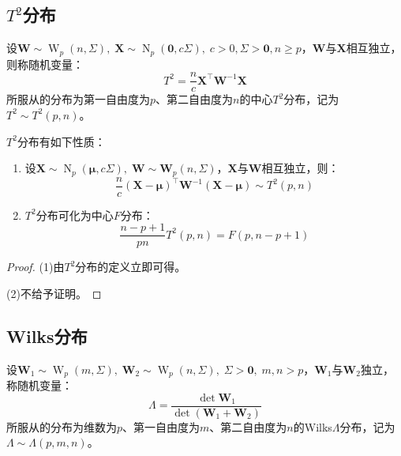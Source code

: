 \subsection{$T^2$分布}
\begin{definition}
	设$\mathbf{W}\sim\operatorname{W}_p(n,\Sigma),\;\mathbf{X}\sim\operatorname{N}_p(\mathbf{0},c\Sigma),\;c>0,\Sigma>\mathbf{0},n\geqslant p$，$\mathbf{W}$与$\mathbf{X}$相互独立，则称随机变量：
	\begin{equation*}
		T^2=\frac{n}{c}\mathbf{X}^{\top}\mathbf{W}^{-1}\mathbf{X}
	\end{equation*}
	所服从的分布为第一自由度为$p$、第二自由度为$n$的中心$T^2$分布，记为$T^2\sim T^2(p,n)$。
\end{definition}
\begin{property}\label{prop:T^2}
	$T^2$分布有如下性质：
	\begin{enumerate}
		\item 设$\mathbf{X}\sim\operatorname{N}_p(\boldsymbol{\mu},c\Sigma),\;\mathbf{W}\sim\mathbf{W}_p(n,\Sigma)$，$\mathbf{X}$与$\mathbf{W}$相互独立，则：
		\begin{equation*}
			\frac{n}{c}(\mathbf{X}-\boldsymbol{\mu})^{\top}\mathbf{W}^{-1}(\mathbf{X}-\boldsymbol{\mu})\sim T^2(p,n)
		\end{equation*}
		\item $T^2$分布可化为中心$F$分布：
		\begin{equation*}
			\frac{n-p+1}{pn}T^2(p,n)=F(p,n-p+1)
		\end{equation*}
	\end{enumerate}
\end{property}
\begin{proof}
	(1)由$T^2$分布的定义立即可得。\par
	(2)不给予证明。
\end{proof}

\subsection{Wilks分布}
\begin{definition}
	设$\mathbf{W}_1\sim\operatorname{W}_p(m,\Sigma),\;\mathbf{W}_2\sim\operatorname{W}_p(n,\Sigma),\;\Sigma>\mathbf{0},\;m,n>p$，$\mathbf{W}_1$与$\mathbf{W}_2$独立，称随机变量：
	\begin{equation*}
		\varLambda=\frac{\det\mathbf{W}_1}{\det(\mathbf{W}_1+\mathbf{W}_2)}
	\end{equation*}
	所服从的分布为维数为$p$、第一自由度为$m$、第二自由度为$n$的Wilks$\varLambda$分布，记为$\varLambda\sim\varLambda(p,m,n)$。
\end{definition}